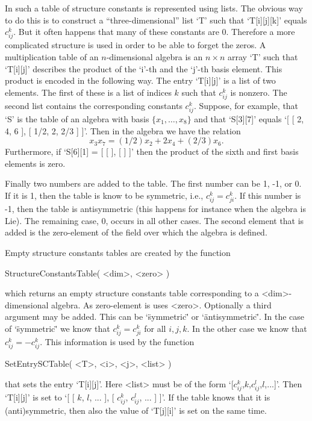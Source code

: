 In {\GAP} such a table of structure constants is represented using 
lists. The obvious way to do this
is to construct a ``three-dimensional'' list `T' such that  
`T[i][j][k]' equals
$c_{ij}^k$. But it often happens that many of these constants are 0.
Therefore a more complicated structure is used in order to be able to 
forget 
the zeros. A multiplication table of an $n$-dimensional algebra is an 
$n\times n$ array `T' such that `T[i][j]' describes the product
of the `i'-th and the `j'-th basis element. This product is encoded
in the following way. The entry `T[i][j]' is a list of two elements. 
The first of these is a list of
indices $k$ such that $c_{ij}^k$ is nonzero. The second list contains the
corresponding constants $c_{ij}^k$. Suppose, for example,  that `S' 
is the table 
of an algebra with basis $\{x_1,\ldots ,x_8\}$ and that `S[3][7]' 
equals `[ [ 2, 4, 6 ], [ 1/2, 2, 2/3 ] ]'. Then in the algebra we 
have the relation 
$$x_3x_7=(1/2) x_2 +2x_4 + (2/3)x_6.$$
Furthermore, if `S[6][1] = [ [  ], [  ] ]' then the product of the
sixth and first basis elements is zero.

Finally two numbers are added to the table. The first number can be
1, -1, or 0. If it is 1, then the table is know to be symmetric,
i.e., $c_{ij}^k=c_{ji}^k$. If this number is -1, then the table is
antisymmetric (this happens for instance when the algebra is Lie).
The remaining case, 0, occurs in all other cases. 
The second element that is added is the zero-element of the field over 
which the algebra is defined.  

Empty structure constants tables are created by the function

\> StructureConstantsTable( <dim>, <zero> )

which returns an empty structure constants table corresponding to
a <dim>-dimensional algebra. As zero-element is uses <zero>. Optionally
a third argument may be added. This can be `\"symmetric\"' or 
`\"antisymmetric\"'.
In the case of `\"symmetric\"' we know that $c_{ij}^k=c_{ji}^k$ for all
$i,j,k$. In the other case we know that $c_{ij}^k=-c_{ij}^k$. This information
is used by the function

\> SetEntrySCTable( <T>, <i>, <j>, <list> )

that sets the entry `T[i][j]'. Here <list> must be of the form 
`[$c_{ij}^k$,$k$,$c_{ij}^l$,$l$,...]'. Then `T[i][j]' is set to
`[ [ $k$, $l$, ... ], [ $c_{ij}^k$, $c_{ij}^l$, ... ] ]'. If the table 
knows that it is (anti)symmetric, then also the value of `T[j][i]' is set
on the same time.


